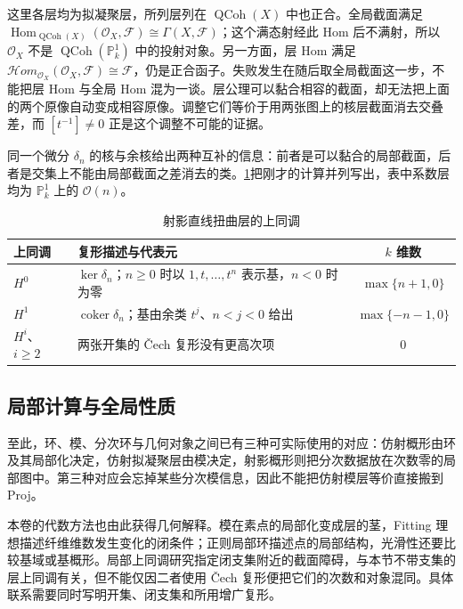 这里各层均为拟凝聚层，所列层列在 \(\operatorname{QCoh}(X)\) 中也正合。全局截面满足 \(\operatorname{Hom}_{\operatorname{QCoh}(X)}(\mathcal O_X,\mathcal F)\cong\Gamma(X,\mathcal F)\)；这个满态射经此 Hom 后不满射，所以 \(\mathcal O_X\) 不是 \(\operatorname{QCoh}(\mathbb P_k^1)\) 中的投射对象。另一方面，层 Hom 满足 \(\mathcal Hom_{\mathcal O_X}(\mathcal O_X,\mathcal F)\cong\mathcal F\)，仍是正合函子。失败发生在随后取全局截面这一步，不能把层 Hom 与全局 Hom 混为一谈。层公理可以黏合相容的截面，却无法把上面的两个原像自动变成相容原像。调整它们等价于用两张图上的核层截面消去交叠差，而 \([t^{-1}]\ne0\) 正是这个调整不可能的证据。

\ProseParagraphBreak
同一个微分 \(\delta_n\) 的核与余核给出两种互补的信息：前者是可以黏合的局部截面，后者是交集上不能由局部截面之差消去的类。\cref{b3:tab:projective-line-cohomology}把刚才的计算并列写出，表中系数层均为 \(\mathbb P_k^1\) 上的 \(\mathcal O(n)\)。

\begin{table}[htbp]
	\centering
	\caption{射影直线扭曲层的上同调}
	\label{b3:tab:projective-line-cohomology}
	\begin{tabularx}{\linewidth}{@{}lXc@{}}
		\toprule
		上同调 & 复形描述与代表元 & \(k\) 维数 \\
		\midrule
		\(H^0\) & \(\ker\delta_n\)；\(n\ge0\) 时以 \(1,t,\ldots,t^n\) 表示基，\(n<0\) 时为零 & \(\max\{n+1,0\}\) \\
		\(H^1\) & \(\operatorname{coker}\delta_n\)；基由余类 \(t^j\)、\(n<j<0\) 给出 & \(\max\{-n-1,0\}\) \\
		\(H^i\)、\(i\ge2\) & 两张开集的 Čech 复形没有更高次项 & \(0\) \\
		\bottomrule
	\end{tabularx}
\end{table}

\subsection{局部计算与全局性质}
\label{b3:subsec:2404:03}
\label{b3:subsec:2405:03}

至此，环、模、分次环与几何对象之间已有三种可实际使用的对应：仿射概形由环及其局部化决定，仿射拟凝聚层由模决定，射影概形则把分次数据放在次数零的局部图中。第三种对应会忘掉某些分次模信息，因此不能把仿射模层等价直接搬到 Proj。

\ProseParagraphBreak
本卷的代数方法也由此获得几何解释。模在素点的局部化变成层的茎，Fitting 理想描述纤维维数发生变化的闭条件；正则局部环描述点的局部结构，光滑性还要比较基域或基概形。局部上同调研究指定闭支集附近的截面障碍，与本节不带支集的层上同调有关，但不能仅因二者使用 Čech 复形便把它们的次数和对象混同。具体联系需要同时写明开集、闭支集和所用增广复形。


